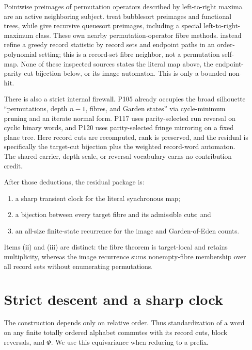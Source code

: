 \documentclass[10pt,a4paper]{amsart}
\theoremstyle{definition}
\theoremstyle{remark}
\begin{document}
Pointwise preimages of permutation operators described by left-to-right
maxima are an active neighboring subject.  \citet{BouvelCioniFerrari2022}
treat bubblesort preimages and functional trees, while
\citet{CioniFerrari2021} give recursive queuesort preimages, including a
special left-to-right-maximum class.  These own nearby permutation-operator
fibre methods.  \citet{Huang2026} instead refine a greedy record statistic by
record sets and endpoint paths in an order-polynomial setting; this is a
record-set fibre neighbor, not a permutation self-map.  None of these
inspected sources states the literal map above, the endpoint-parity cut
bijection below, or its image automaton.  This is only a bounded non-hit.

There is also a strict internal firewall.  P105 already occupies the broad
silhouette ``permutations, depth \(n-1\), fibres, and Garden states'' via
cycle-minimum pruning and an iterate normal form.  P117 uses parity-selected
run reversal on cyclic binary words, and P120 uses parity-selected fringe
mirroring on a fixed plane tree.  Here record cuts are recomputed, rank is
preserved, and the residual is specifically the target-cut bijection plus
the weighted record-word automaton.  The shared carrier, depth scale, or
reversal vocabulary earns no contribution credit.

After those deductions, the residual package is:
\begin{enumerate}[label=\textup{(\roman*)}]
\item a sharp transient clock for the literal synchronous map;
\item a bijection between every target fibre and its admissible cuts; and
\item an all-size finite-state recurrence for the image and
      Garden-of-Eden counts.
\end{enumerate}
Items (ii) and (iii) are distinct: the fibre theorem is target-local and
retains multiplicity, whereas the image recurrence sums nonempty-fibre
membership over all record sets without enumerating permutations.

\section{Strict descent and a sharp clock}

The construction depends only on relative order.  Thus standardization of
a word on any finite totally ordered alphabet commutes with its record cuts,
block reversals, and \(\Phi\).  We use this equivariance when reducing to a
prefix.
\end{document}

